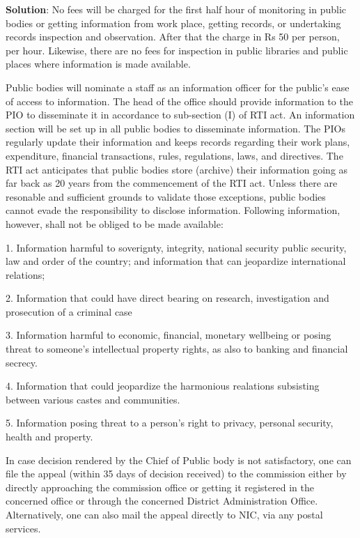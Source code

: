 \documentclass[
  openany]{book}
\newenvironment{solution}{ {\bfseries Solution}:}{}
\begin{document}
\begin{questions}
\begin{solution}
No fees will be charged for the first half hour of monitoring in public bodies or getting information from work place, getting records, or undertaking records inspection and observation. After that the charge in Rs 50 per person, per hour. Likewise, there are no fees for inspection in public libraries and public places where information is made available.

Public bodies will nominate a staff as an information officer for the public's ease of access to information. The head of the office should provide information to the PIO to disseminate it in accordance to sub-section (I) of RTI act. An information section will be set up in all public bodies to disseminate information. The PIOs regularly update their information and keeps records regarding their work plans, expenditure, financial transactions, rules, regulations, laws, and directives. The RTI act anticipates that public bodies store (archive) their information going as far back as 20 years from the commencement of the RTI act. Unless there are resonable and sufficient grounds to validate those exceptions, public bodies cannot evade the responsibility to disclose information. Following information, however, shall not be obliged to be made available:

1. Information harmful to soverignty, integrity, national security public security, law and order of the country; and information that can jeopardize international relations;

2. Information that could have direct bearing on research, investigation and prosecution of a criminal case

3. Information harmful to economic, financial, monetary wellbeing or posing threat to someone's intellectual property rights, as also to banking and financial secrecy.

4. Information that could jeopardize the harmonious realations subsisting between various castes and communities.

5. Information posing threat to a person's right to privacy, personal security, health and property.


In case decision rendered by the Chief of Public body is not satisfactory, one can file the appeal (within 35 days of decision received) to the commission either by directly approaching the commission office or getting it registered in the concerned office or through the concerned District Administration Office. Alternatively, one can also mail the appeal directly to NIC, via any postal services.


\end{solution}
\end{questions}
\end{document}

